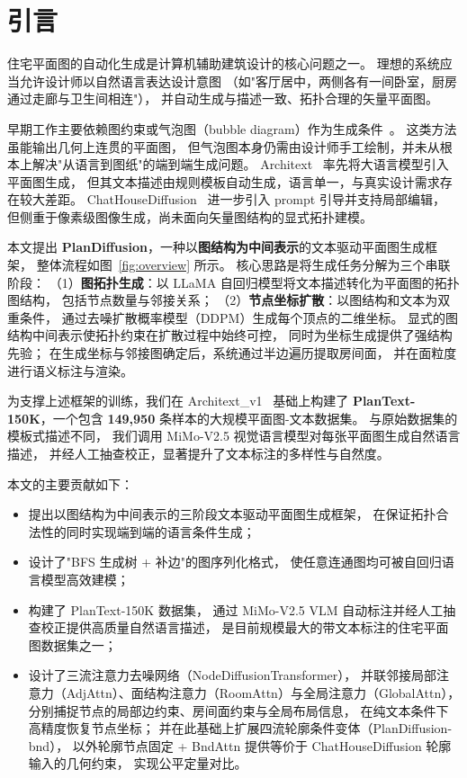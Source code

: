 \section{引言}
\label{sec:introduction}

住宅平面图的自动化生成是计算机辅助建筑设计的核心问题之一。
理想的系统应当允许设计师以自然语言表达设计意图
（如"客厅居中，两侧各有一间卧室，厨房通过走廊与卫生间相连"），
并自动生成与描述一致、拓扑合理的矢量平面图。

早期工作主要依赖图约束或气泡图（bubble diagram）作为生成条件~\cite{nauata2020housegan,shabani2023housediffusion}。
这类方法虽能输出几何上连贯的平面图，
但气泡图本身仍需由设计师手工绘制，并未从根本上解决"从语言到图纸"的端到端生成问题。
Architext~\cite{galanos2023architext} 率先将大语言模型引入平面图生成，
但其文本描述由规则模板自动生成，语言单一，与真实设计需求存在较大差距。
ChatHouseDiffusion~\cite{qin2025chathousediffusion} 进一步引入 prompt 引导并支持局部编辑，
但侧重于像素级图像生成，尚未面向矢量图结构的显式拓扑建模。

本文提出 \textbf{PlanDiffusion}，一种以\textbf{图结构为中间表示}的文本驱动平面图生成框架，
整体流程如图~\ref{fig:overview} 所示。
核心思路是将生成任务分解为三个串联阶段：
（1）\textbf{图拓扑生成}：以 LLaMA 自回归模型将文本描述转化为平面图的拓扑图结构，
包括节点数量与邻接关系；
（2）\textbf{节点坐标扩散}：以图结构和文本为双重条件，
通过去噪扩散概率模型（DDPM）生成每个顶点的二维坐标。
显式的图结构中间表示使拓扑约束在扩散过程中始终可控，
同时为坐标生成提供了强结构先验；
在生成坐标与邻接图确定后，系统通过半边遍历提取房间面，
并在面粒度进行语义标注与渲染。

为支撑上述框架的训练，我们在 Architext\_v1~\cite{galanos2023architext} 基础上构建了
\textbf{PlanText-150K}，一个包含 \textbf{149,950} 条样本的大规模平面图-文本数据集。
与原始数据集的模板式描述不同，
我们调用 MiMo-V2.5 视觉语言模型对每张平面图生成自然语言描述，
并经人工抽查校正，显著提升了文本标注的多样性与自然度。

本文的主要贡献如下：
\begin{itemize}
    \item 提出以图结构为中间表示的三阶段文本驱动平面图生成框架，
    在保证拓扑合法性的同时实现端到端的语言条件生成；
    \item 设计了"BFS 生成树 + 补边"的图序列化格式，
    使任意连通图均可被自回归语言模型高效建模；
    \item 构建了 PlanText-150K 数据集，
    通过 MiMo-V2.5 VLM 自动标注并经人工抽查校正提供高质量自然语言描述，
    是目前规模最大的带文本标注的住宅平面图数据集之一；
    \item 设计了三流注意力去噪网络（NodeDiffusionTransformer），
    并联邻接局部注意力（AdjAttn）、面结构注意力（RoomAttn）与全局注意力（GlobalAttn），
    分别捕捉节点的局部边约束、房间面约束与全局布局信息，
    在纯文本条件下高精度恢复节点坐标；
    并在此基础上扩展四流轮廓条件变体（PlanDiffusion-bnd），
    以外轮廓节点固定 + BndAttn 提供等价于 ChatHouseDiffusion 轮廓输入的几何约束，
    实现公平定量对比。
\end{itemize}

